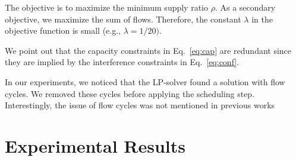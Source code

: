\documentclass[11pt]{article}
\newenvironment{proof sketch}[1]{\noindent {\emph{Proof sketch of #1:}}}{\hfill \qed}
\newcommand{\algA}{\textsc{MF-I-S}}
\begin{document}
The objective is to maximize the minimum supply ratio $\rho$.  As a
secondary objective, we maximize the sum of flows.  Therefore, the
constant $\lambda$ in the objective function is small (e.g.,
$\lambda=1/20)$.

We point out that the capacity constraints in Eq.~\ref{eq:cap} are
redundant since they are implied by the interference constraints in
Eq.~\ref{eq:conf}.

In our experiments, we noticed that the LP-solver found a solution
with flow cycles. We removed these cycles before applying the
scheduling step.  Interestingly, the issue of flow cycles was not
mentioned in previous
works~\cite{alicherry2005joint11,buragohain2007improved}

\section{Experimental Results}\label{sec:exres}
\end{document}
